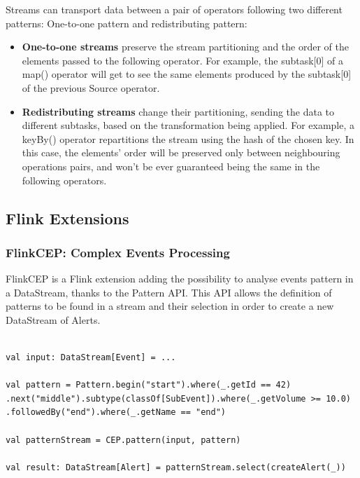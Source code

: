 Streams can transport data between a pair of operators following two different patterns: One-to-one pattern and redistributing pattern:
\begin{itemize}
	\item \textbf{One-to-one streams} preserve the stream partitioning and the order of the elements passed to the following operator. For example, the subtask[0] of a map() operator will get to see the same elements produced by the subtask[0] of the previous Source operator.
   
    \item \textbf{Redistributing streams} change their partitioning, sending the data to different subtasks, based on the transformation being applied. For example, a keyBy() operator repartitions the stream using the hash of the chosen key. In this case, the elements' order will be preserved only between neighbouring operations pairs, and won't be ever guaranteed being the same in the following operators.
\end{itemize}

\subsection{Flink Extensions} \label{FlinkLibs}

\subsubsection{FlinkCEP: Complex Events Processing}

FlinkCEP is a Flink extension adding the possibility to analyse events pattern in a DataStream, thanks to the Pattern API. This API allows the definition of patterns to be found in a stream and their selection in order to create a new DataStream of Alerts.\\


\begin{code}
\label{code:pattern-example}
\begin{verbatim}

val input: DataStream[Event] = ...

val pattern = Pattern.begin("start").where(_.getId == 42)
.next("middle").subtype(classOf[SubEvent]).where(_.getVolume >= 10.0)
.followedBy("end").where(_.getName == "end")

val patternStream = CEP.pattern(input, pattern)

val result: DataStream[Alert] = patternStream.select(createAlert(_))
\end{verbatim}
\end{code}~\\

